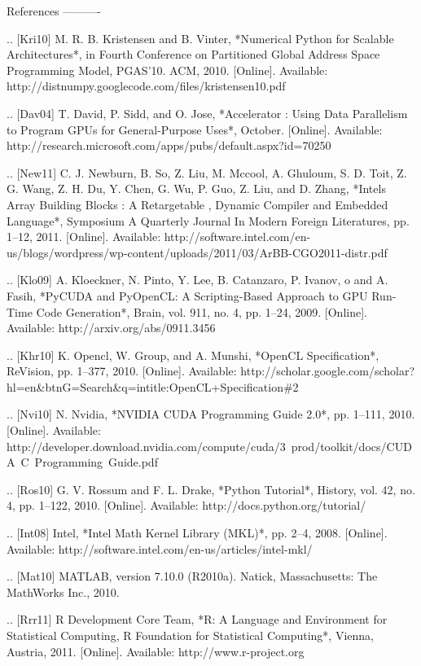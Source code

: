 
References
----------

.. [Kri10] M. R. B. Kristensen and B. Vinter, *Numerical Python for Scalable Architectures*,
            in Fourth Conference on Partitioned Global Address Space Programming Model, PGAS{’}10. ACM, 2010. [Online]. Available: http://distnumpy.googlecode.com/files/kristensen10.pdf

.. [Dav04] T. David, P. Sidd, and O. Jose, *Accelerator : Using Data Parallelism to Program GPUs for General-Purpose Uses*,
            October. [Online]. Available: http://research.microsoft.com/apps/pubs/default.aspx?id=70250

.. [New11] C. J. Newburn, B. So, Z. Liu, M. Mccool, A. Ghuloum, S. D. Toit, Z. G. Wang, Z. H. Du, Y. Chen, G. Wu, P. Guo, Z. Liu, and D. Zhang, *Intels Array Building Blocks : A Retargetable , Dynamic Compiler and Embedded Language*,
             Symposium A Quarterly Journal In Modern Foreign Literatures, pp. 1–12, 2011. [Online]. Available: http://software.intel.com/en-us/blogs/wordpress/wp-content/uploads/2011/03/ArBB-CGO2011-distr.pdf

.. [Klo09] A. Kloeckner, N. Pinto, Y. Lee, B. Catanzaro, P. Ivanov, o and A. Fasih, *PyCUDA and PyOpenCL: A Scripting-Based Approach to GPU Run-Time Code Generation*,
            Brain, vol. 911, no. 4, pp. 1–24, 2009. [Online]. Available: http://arxiv.org/abs/0911.3456

.. [Khr10] K. Opencl, W. Group, and A. Munshi, *OpenCL Specification*,
            ReVision, pp. 1–377, 2010. [Online]. Available: http://scholar.google.com/scholar?hl=en\&btnG=Search\&q=intitle:OpenCL+Specification\#2

.. [Nvi10] N. Nvidia, *NVIDIA CUDA Programming Guide 2.0*,
            pp. 1–111, 2010. [Online]. Available: http://developer.download.nvidia.com/compute/cuda/3\2\ prod/toolkit/docs/CUDA\ C\ Programming\ Guide.pdf

.. [Ros10] G. V. Rossum and F. L. Drake, *Python Tutorial*,
            History, vol. 42, no. 4, pp. 1–122, 2010. [Online]. Available: http://docs.python.org/tutorial/

.. [Int08] Intel, *Intel Math Kernel Library (MKL)*,
            pp. 2–4, 2008. [Online]. Available: http://software.intel.com/en-us/articles/intel-mkl/

.. [Mat10] MATLAB, version 7.10.0 (R2010a).
            Natick, Massachusetts: The MathWorks Inc., 2010.

.. [Rrr11] R Development Core Team, *R: A Language and Environment for Statistical Computing, R Foundation for Statistical Computing*,
            Vienna, Austria, 2011. [Online]. Available: http://www.r-project.org

